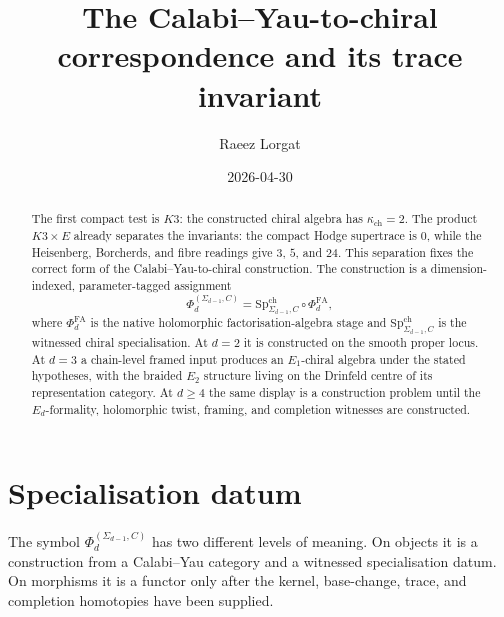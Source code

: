 \documentclass[11pt]{amsart}
\title[CY to chiral correspondence]{The Calabi--Yau-to-chiral
correspondence and its trace invariant}
\author{Raeez Lorgat}
\date{2026-04-30}
\providecommand{\PhiFA}{\Phi^{\mathrm{FA}}}
\providecommand{\SpCh}{\mathrm{Sp}^{\mathrm{ch}}}
\theoremstyle{definition}
\theoremstyle{remark}
\begin{document}
\begin{abstract}
The first compact test is $K3$: the constructed chiral algebra has
$\kappa_{\mathrm{ch}}=2$. The product $K3\times E$ already separates the
invariants: the compact Hodge supertrace is $0$, while the Heisenberg,
Borcherds, and fibre readings give $3$, $5$, and $24$. This separation fixes
the correct form of the Calabi--Yau-to-chiral construction. The construction is a
dimension-indexed, parameter-tagged assignment
\[
        \Phi_d^{(\Sigma_{d-1},C)}
        =\SpCh_{\Sigma_{d-1},C}\circ \PhiFA_d,
\]
where \(\PhiFA_d\) is the native holomorphic factorisation-algebra stage and
\(\SpCh_{\Sigma_{d-1},C}\) is the witnessed chiral specialisation. At $d=2$ it
is constructed on the smooth proper locus. At $d=3$ a chain-level framed input
produces an \(E_1\)-chiral algebra under the stated hypotheses, with the
braided \(E_2\) structure living on the Drinfeld centre of its representation
category. At $d\geq 4$ the same display is a construction problem until the
\(E_d\)-formality, holomorphic twist, framing, and completion witnesses are
constructed.
\end{abstract}
\maketitle

\section{Specialisation datum}

The symbol \(\Phi_d^{(\Sigma_{d-1},C)}\) has two different levels of
meaning. On objects it is a construction from a Calabi--Yau category and a
witnessed specialisation datum. On morphisms it is a functor only after the
kernel, base-change, trace, and completion homotopies have been supplied.
\end{document}
